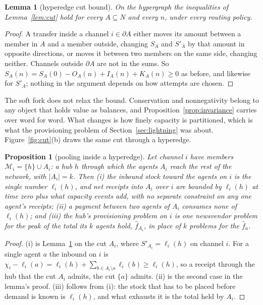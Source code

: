 \documentclass[11pt]{article}
\theoremstyle{plain}
\newtheorem{lemma}{Lemma}
\newtheorem{proposition}{Proposition}
\theoremstyle{definition}
\theoremstyle{remark}
\begin{document}
\begin{lemma}[hyperedge cut bound]
\label{lem:hypercut}
On the hypergraph the inequalities of Lemma~\ref{lem:cut} hold for every $A\subseteq N$ and every $n$, under every routing policy.
\end{lemma}

\begin{proof}
A transfer inside a channel $i\in\partial A$ either moves its amount between a member in $A$ and a member outside, changing $S_A$ and $S'_A$ by that amount in opposite directions, or moves it between two members on the same side, changing neither. Channels outside $\partial A$ are not in the sums. So $S_A(n)=S_A(0)-O_A(n)+I_A(n)+K_A(n)\ge 0$ as before, and likewise for $S'_A$; nothing in the argument depends on how attempts are chosen.
\end{proof}

The soft fork does not relax the bound. Conservation and nonnegativity belong to any object that holds value as balances, and Proposition~\ref{prop:invariance} carries over word for word. What changes is how finely capacity is partitioned, which is what the provisioning problem of Section~\ref{sec:lightning} was about. Figure~\ref{fig:cut}(b) draws the same cut through a hyperedge.

\begin{proposition}[pooling inside a hyperedge]
\label{prop:hyperpool}
Let channel $i$ have members $\mathcal M_i=\{h\}\cup A_i$: a hub $h$ through which the agents $A_i$ reach the rest of the network, with $|A_i|=k$. Then (i) the inbound stock toward the agents on $i$ is the single number $\ell_i(h)$, and net receipts into $A_i$ over $i$ are bounded by $\ell_i(h)$ at time zero plus what capacity events add, with no separate constraint on any one agent's receipts; (ii) a payment between two agents of $A_i$ consumes none of $\ell_i(h)$; and (iii) the hub's provisioning problem on $i$ is one newsvendor problem for the peak of the total its $k$ agents hold, $\hat f_{A_i}$, in place of $k$ problems for the $\hat f_a$.
\end{proposition}

\begin{proof}
(i) is Lemma~\ref{lem:hypercut} on the cut $A_i$, where $S'_{A_i}=\ell_i(h)$ on channel $i$. For a single agent $a$ the inbound on $i$ is $\chi_i-\ell_i(a)=\ell_i(h)+\sum_{b\in A_i\setminus a}\ell_i(b)\ge\ell_i(h)$, so a receipt through the hub that the cut $A_i$ admits, the cut $\{a\}$ admits. (ii) is the second case in the lemma's proof. (iii) follows from (i): the stock that has to be placed before demand is known is $\ell_i(h)$, and what exhausts it is the total held by $A_i$.
\end{proof}
\end{document}
